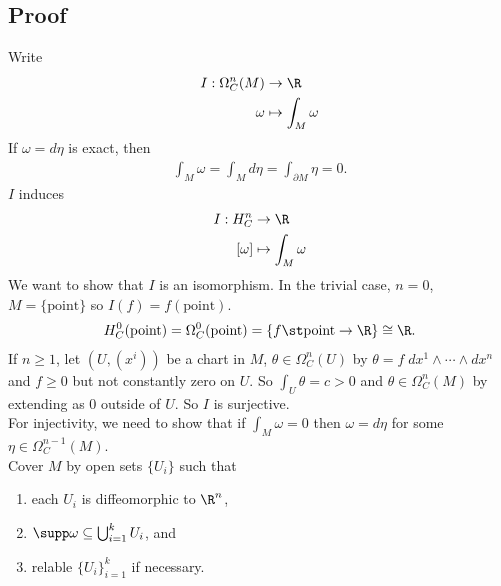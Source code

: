 \documentclass[11pt]{article}
\begin{document}
\subsection*{Proof}
\label{sec:org65cc8bc}
Write\\
\begin{align*}
  I:\Omega_{C}^{n}(M)&\to\R\\
  \omega&\mapsto\int_{M}\omega
\end{align*}
If \(\omega=d\eta\) is exact, then\\
\begin{align*}
  \int_{M}\omega=\int_{M}d\eta=\int_{\partial M}\eta=0.
\end{align*}
\(I\) induces\\
\begin{align*}
  I:H^{n}_{C}&\to\R\\
  [\omega]&\mapsto\int_{M}\omega
\end{align*}
We want to show that \(I\) is an isomorphism. In the trivial case, \(n=0\), \(M=\{\text{point}\}\) so \(I(f)=f(\text{point})\).\\
\begin{align*}
  H_{C}^{0}(\text{point})
  =\Omega^{0}_{C}(\text{point})
  =\{f\st\text{point}\to\R\}
  \cong\R.
\end{align*}
If \(n\geq 1\), let \((U,(x^{i}))\) be a chart in \(M\), \(\theta\in\Omega^{n}_{C}(U)\) by \(\theta=f\;dx^{1}\wedge\cdots\wedge dx^{n}\) and \(f\geq 0\) but not constantly zero on \(U\). So \(\int_{U}\theta=c>0\) and \(\theta\in\Omega^{n}_{C}(M)\) by extending as \(0\) outside of \(U\). So \(I\) is surjective.\\
For injectivity, we need to show that if \(\int_{M}\omega=0\) then \(\omega=d\eta\) for some \(\eta\in\Omega^{n-1}_{C}(M)\).\\
Cover \(M\) by open sets \(\{U_{i}\}\) such that\\
\begin{enumerate}
\item each \(U_{i}\) is diffeomorphic to \(\R^{n}\),\\
\item \(\supp\omega\subseteq \bigcup_{i=1}^{k}U_{i}\), and\\
\item relable \(\{U_{i}\}_{i=1}^{k}\) if necessary.\\
\end{enumerate}
\end{document}
